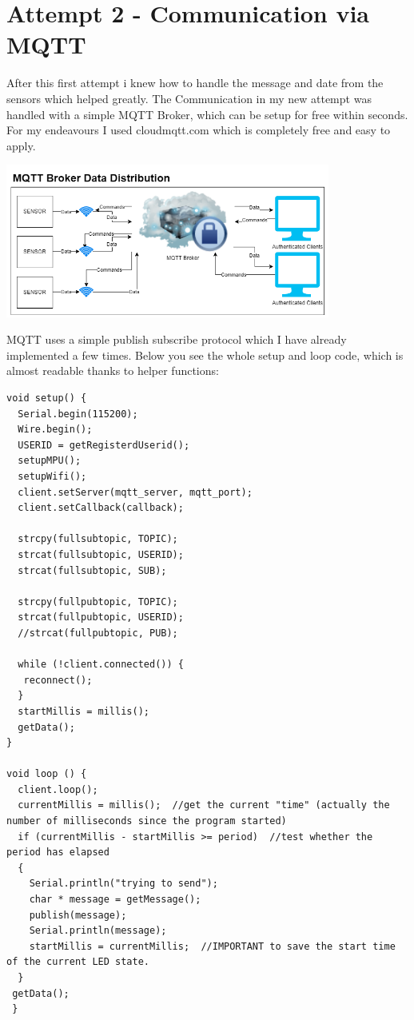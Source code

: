 \section{Attempt 2 - Communication via MQTT}

After this first attempt i knew how to handle the message and date from the sensors which helped greatly. 
The Communication in my new attempt was handled with a simple MQTT Broker, which can be setup for free within seconds. For my endeavours I used cloudmqtt.com which is completely free and easy to apply. 


\begin{center}
\includegraphics[width=0.8\textwidth]{images/CommunicationDiagrammMQTT.png}
\end{center}
MQTT uses a simple publish subscribe protocol which I have already implemented a few times.
Below you see the whole setup and loop code, which is almost readable thanks to helper functions:
\begin{lstlisting}
void setup() {
  Serial.begin(115200);
  Wire.begin();
  USERID = getRegisterdUserid();
  setupMPU();
  setupWifi();
  client.setServer(mqtt_server, mqtt_port);
  client.setCallback(callback);

  strcpy(fullsubtopic, TOPIC); 
  strcat(fullsubtopic, USERID);
  strcat(fullsubtopic, SUB);
  
  strcpy(fullpubtopic, TOPIC); 
  strcat(fullpubtopic, USERID);
  //strcat(fullpubtopic, PUB);
  
  while (!client.connected()) {
   reconnect();
  }
  startMillis = millis(); 
  getData();
}

void loop () {
  client.loop();
  currentMillis = millis();  //get the current "time" (actually the number of milliseconds since the program started)
  if (currentMillis - startMillis >= period)  //test whether the period has elapsed
  {
    Serial.println("trying to send");
    char * message = getMessage();
    publish(message);
    Serial.println(message);
    startMillis = currentMillis;  //IMPORTANT to save the start time of the current LED state.
  }
 getData();
 }
\end{lstlisting}

